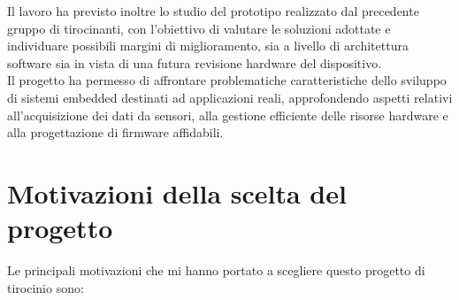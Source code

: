 Il lavoro ha previsto inoltre lo studio del prototipo realizzato dal precedente gruppo di tirocinanti, con l'obiettivo di valutare
le soluzioni adottate e individuare possibili margini di miglioramento, sia a livello di architettura software sia in vista di
una futura revisione hardware del dispositivo.\\


Il progetto ha permesso di affrontare problematiche caratteristiche dello sviluppo di sistemi embedded destinati ad applicazioni
reali, approfondendo aspetti relativi all'acquisizione dei dati da sensori, alla gestione efficiente delle risorse hardware e alla
progettazione di firmware affidabili.

\section{Motivazioni della scelta del progetto}
Le principali motivazioni che mi hanno portato a scegliere questo progetto di tirocinio sono:

